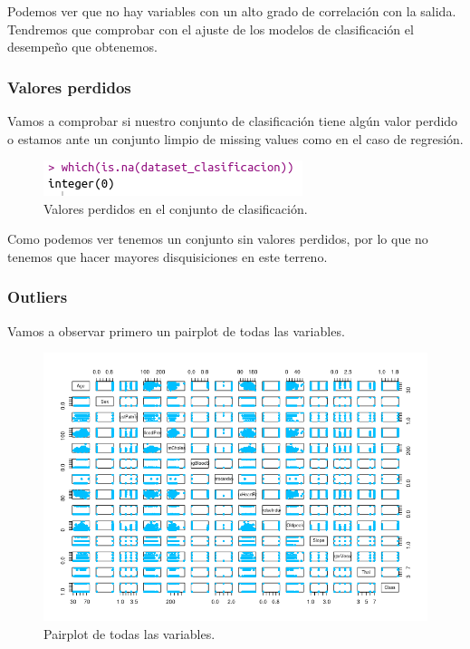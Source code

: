 \documentclass[12pt,a4paper]{article}
\begin{document}
Podemos ver que no hay variables con un alto grado de correlación con la salida. Tendremos que comprobar con el ajuste de los modelos de clasificación el desempeño que obtenemos.

\subsubsection{Valores perdidos}

Vamos a comprobar si nuestro conjunto de clasificación tiene algún valor perdido o estamos ante un conjunto limpio de missing values como en el caso de regresión.

\begin{figure}[H]
	\centering
	\includegraphics[scale=0.7]{./Imagenes/EDA/Clasificacion/valores_perdidos.png}
	\caption{Valores perdidos en el conjunto de clasificación.}
\end{figure}

Como podemos ver tenemos un conjunto sin valores perdidos, por lo que no tenemos que hacer mayores disquisiciones en este terreno.

\subsubsection{Outliers}

Vamos a observar primero un pairplot de todas las variables.

\begin{figure}[H]
	\centering
	\includegraphics[scale=0.9]{./Imagenes/EDA/Clasificacion/pairplot_todas.png}
	\caption{Pairplot de todas las variables.}
\end{figure}
\end{document}
